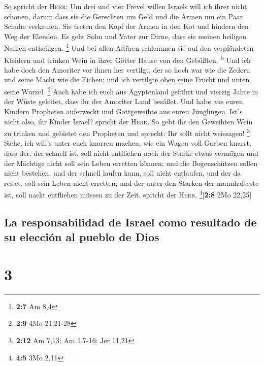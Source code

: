  So spricht der \textsc{Herr}: Um drei und vier Frevel
willen Israels will ich ihrer nicht schonen, darum dass sie die
Gerechten um Geld und die Armen um ein Paar Schuhe verkaufen.
 Sie treten den Kopf der Armen in den Kot und hindern den
Weg der Elenden. Es geht Sohn und Vater zur Dirne, dass sie meinen
heiligen Namen entheiligen. \footnote{\textbf{2:7} Am 8,4}
 Und bei allen Altären schlemmen sie auf den verpfändeten
Kleidern und trinken Wein in ihrer Götter Hause von den Gebüßten.
\textsuperscript{b}  Und ich habe doch den Amoriter vor
ihnen her vertilgt, der so hoch war wie die Zedern und seine Macht wie
die Eichen; und ich vertilgte oben seine Frucht und unten seine Wurzel.
\footnote{\textbf{2:9} 4Mo 21,21-28}  Auch habe ich euch
aus Ägyptenland geführt und vierzig Jahre in der Wüste geleitet, dass
ihr der Amoriter Land besäßet.  Und habe aus euren
Kindern Propheten auferweckt und Gottgeweihte aus euren Jünglingen.
Ist's nicht also, ihr Kinder Israel? spricht der \textsc{Herr}.
 So gebt ihr den Geweihten Wein zu trinken und gebietet
den Propheten und sprecht: Ihr sollt nicht weissagen! \footnote{\textbf{2:12}
  Am 7,13; Am 1,7-16; Jer 11,21}  Siehe, ich will's unter
euch knarren machen, wie ein Wagen voll Garben knarrt, 
dass der, der schnell ist, soll nicht entfliehen noch der Starke etwas
vermögen und der Mächtige nicht soll sein Leben erretten können;
 und die Bogenschützen sollen nicht bestehen, und der
schnell laufen kann, soll nicht entlaufen, und der da reitet, soll sein
Leben nicht erretten;  und der unter den Starken der
mannhafteste ist, soll nackt entfliehen müssen zu der Zeit, spricht der
\textsc{Herr}. \footnote{\textbf{4:5} 3Mo 2,11}{[}\textbf{2:8} 2Mo
22,25{]}

\hypertarget{la-responsabilidad-de-israel-como-resultado-de-su-elecciuxf3n-al-pueblo-de-dios}{%
\subsection{La responsabilidad de Israel como resultado de su elección
al pueblo de
Dios}\label{la-responsabilidad-de-israel-como-resultado-de-su-elecciuxf3n-al-pueblo-de-dios}}

\hypertarget{section-2}{%
\section{3}\label{section-2}}

